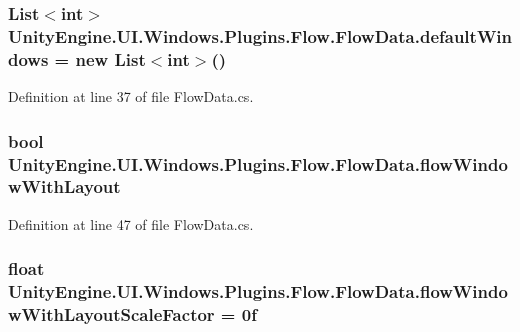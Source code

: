 \subsubsection[{default\+Windows}]{\setlength{\rightskip}{0pt plus 5cm}List$<$int$>$ Unity\+Engine.\+U\+I.\+Windows.\+Plugins.\+Flow.\+Flow\+Data.\+default\+Windows = new List$<$int$>$()}\label{class_unity_engine_1_1_u_i_1_1_windows_1_1_plugins_1_1_flow_1_1_flow_data_ab77722d19c70ba6cfa967a6d2d7eb8d8}


Definition at line 37 of file Flow\+Data.\+cs.

\hypertarget{class_unity_engine_1_1_u_i_1_1_windows_1_1_plugins_1_1_flow_1_1_flow_data_a1457e3979c28018672af913d465738e5}{}
\subsubsection[{flow\+Window\+With\+Layout}]{\setlength{\rightskip}{0pt plus 5cm}bool Unity\+Engine.\+U\+I.\+Windows.\+Plugins.\+Flow.\+Flow\+Data.\+flow\+Window\+With\+Layout}\label{class_unity_engine_1_1_u_i_1_1_windows_1_1_plugins_1_1_flow_1_1_flow_data_a1457e3979c28018672af913d465738e5}


Definition at line 47 of file Flow\+Data.\+cs.

\hypertarget{class_unity_engine_1_1_u_i_1_1_windows_1_1_plugins_1_1_flow_1_1_flow_data_a3552eca1898bf14055a7f1a87328bb72}{}
\subsubsection[{flow\+Window\+With\+Layout\+Scale\+Factor}]{\setlength{\rightskip}{0pt plus 5cm}float Unity\+Engine.\+U\+I.\+Windows.\+Plugins.\+Flow.\+Flow\+Data.\+flow\+Window\+With\+Layout\+Scale\+Factor = 0f}\label{class_unity_engine_1_1_u_i_1_1_windows_1_1_plugins_1_1_flow_1_1_flow_data_a3552eca1898bf14055a7f1a87328bb72}


